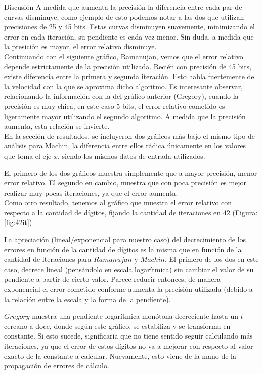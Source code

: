 \begin{section}{Discusión}
	A medida que aumenta la precisión la diferencia entre cada par de curvas disminuye, como ejemplo de esto podemos notar a las dos que utilizan precisiones de 25 y 45 bits. Estas curvas disminuyen suavemente, minimizando el error en cada iteración, su pendiente es cada vez menor. Sin duda, a medida que la presición es mayor, el error relativo disminuye.\\

	
	Continuando con el siguiente gráfico, Ramanujan, vemos que el error relativo depende estrictamente de la precisión utilizada. Recién con precisión de 45 bits, existe diferencia entre la primera y segunda iteración. Esto habla fuertemente de la velocidad con la que se aproxima dicho algoritmo. Es interesante observar, relacionando la información con la del gráfico anterior (Gregory), cuando la precisión es muy chica, en este caso 5 bits, el error relativo cometido es ligeramente mayor utilizando el segundo algoritmo. A medida que la precisión aumenta, esta relación se invierte.\\
	
	En la sección de resultados, se incluyeron dos gráficos más bajo el mismo tipo de análisis para Machin, la diferencia entre ellos rádica únicamente en los valores que toma el eje $x$, siendo los mismos datos de entrada utilizados.
	
	El primero de los dos gráficos muestra simplemente que a mayor precisión, menor error relativo. El segundo en cambio, muestra que con poca precisión es mejor realizar muy pocas iteraciones, ya que el error aumenta.\\
	
	Como otro resultado, tenemos al gráfico que muestra el error relativo con respecto a la cantidad de dígitos, fijando la cantidad de iteraciones en $42$ (Figura:\ref{fig:42it})
	
	La apreciación (lineal/exponencial para nuestro caso) del decrecimiento de los errores en función de la cantidad de dígitos es la misma que en función de la cantidad de iteraciones para $Ramanujan$ y $Machin$. El primero de los dos en este caso, decrece lineal (pensándolo en escala logarítmica) sin cambiar el valor de su pendiente a partir de cierto valor. Parece reducir entonces, de manera exponencial el error cometido conforme aumenta la precisión utilizada (debido a la relación entre la escala y la forma de la pendiente).
	
	$Gregory$ muestra una pendiente logarítmica monótona decreciente hasta un $t$ cercano a doce, donde según este gráfico, se estabiliza y se transforma en constante. Si esto sucede, significaría que no tiene sentido seguir calculando más iteraciones, ya que el error de estos dígitos no va a mejorar con respecto al valor exacto de la constante a calcular. Nuevamente, esto viene de la mano de la propagación de errores de cálculo.
	

\end{section}
